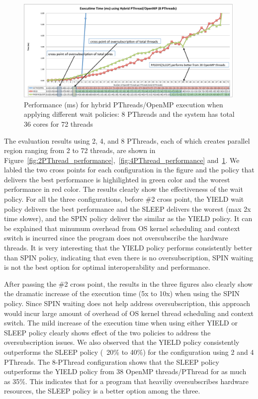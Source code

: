 \begin{figure}[h]
    \includegraphics[width=0.99\textwidth] {images/8PThread_performance}
    \caption{Performance (ms) for hybrid PThreads/OpenMP execution when applying different wait policies: 8 PThreads and the system has total 36 cores for 72 threads}
    \label{fig:8PThread_performance}
\end{figure}

The evaluation results using 2, 4, and 8 PThreads, each of which creates {\sf parallel} region ranging 
from 2 to 72 threads, are shown in Figure~\ref{fig:2PThread_performance},~\ref{fig:4PThread_performance} 
and~\ref{fig:8PThread_performance}. We labled the two cross points for each configuration in the figure and the 
policy that delivers the best performance is highilighted in green color and the worest performance in red color.
The results clearly show the effectiveness of the wait policy. For all the three configurations, 
before \#2 cross point, the YIELD wait policy delivers the best performance and 
the SLEEP delivers the worest (max 2x time slower), 
and the SPIN policy deliver the similar as the YIELD policy. It can be explained 
that minumum overhead from OS kernel scheduling and context switch is incurred since 
the program does not oversubscribe the hardware threads. It is very interesting that the YIELD policy performs
consistently better than SPIN policy, indicating that even there is no oversubscription, SPIN waiting is not 
the best option for optimal interoperability and performance.

After passing the \#2 cross point, the results in the three figures also clearly show the dramatic increase 
of the execution time (5x to 10x) when using the SPIN policy. 
Since SPIN waiting does not help address oversubscription, this 
approach would incur large amount of overhead of OS kernel thread scheduling and context switch. The mild increase
of the execution time when using either YIELD or SLEEP policy clearly shows effect of the two policies to address
the oversubscription issues. We also observed that the YIELD policy consistently outperforms the SLEEP 
policy (~20\% to 40\%) for the configuration using 2 and 4 PThreads. The 8-PThread configuration shows that the 
SLEEP policy outperforms the YIELD policy from 38 OpenMP threads/PThread for as much as 35\%. This indicates that 
for a program that heaviliy oversubscribes hardware resources, the SLEEP policy is a better option among the three.

